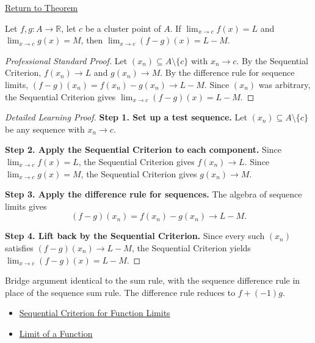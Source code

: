 \newpage
{}
\label{prf:limit-difference}

\begin{remark*}[Return]
\hyperref[thm:limit-difference]{Return to Theorem}
\end{remark*}

\begin{theorem*}
Let $f, g : A \to \mathbb{R}$, let $c$ be a cluster point of $A$. If
$\lim_{x\to c}f(x)=L$ and $\lim_{x\to c}g(x)=M$, then
$\lim_{x\to c}(f-g)(x) = L-M$.
\end{theorem*}

\begin{proof}[Professional Standard Proof]
\LRAProofBodyStart
Let $(x_n) \subseteq A \setminus \{c\}$ with $x_n \to c$.
By the Sequential Criterion, $f(x_n) \to L$ and $g(x_n) \to M$.
By the difference rule for sequence limits, $(f-g)(x_n) = f(x_n)-g(x_n) \to L-M$.
Since $(x_n)$ was arbitrary, the Sequential Criterion gives
$\lim_{x\to c}(f-g)(x) = L-M$.
\end{proof}

\begin{proof}[Detailed Learning Proof]
\LRAProofBodyStart
\textbf{Step 1. Set up a test sequence.}
Let $(x_n) \subseteq A \setminus \{c\}$ be any sequence with $x_n \to c$.

\textbf{Step 2. Apply the Sequential Criterion to each component.}
Since $\lim_{x\to c}f(x)=L$, the Sequential Criterion gives $f(x_n) \to L$.
Since $\lim_{x\to c}g(x)=M$, the Sequential Criterion gives $g(x_n) \to M$.

\textbf{Step 3. Apply the difference rule for sequences.}
The algebra of sequence limits gives
\[
  (f-g)(x_n) = f(x_n) - g(x_n) \to L - M.
\]

\textbf{Step 4. Lift back by the Sequential Criterion.}
Since every such $(x_n)$ satisfies $(f-g)(x_n) \to L-M$, the Sequential
Criterion yields $\lim_{x\to c}(f-g)(x) = L-M$.
\end{proof}

\begin{remark*}
Bridge argument identical to the sum rule, with the sequence difference rule
in place of the sequence sum rule. The difference rule reduces to $f + (-1)g$.
\end{remark*}

\begin{dependencies}
\begin{itemize}
  \item \hyperref[prop:sequential-criterion-limits]{Sequential Criterion for Function Limits}
  \item \hyperref[def:limit-function]{Limit of a Function}
\end{itemize}
\end{dependencies}

\clearpage
